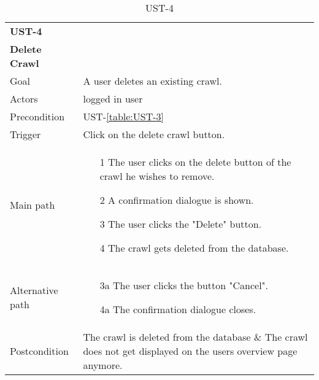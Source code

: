 \documentclass[titlepage, 12pt]{article}
\begin{document}
  \begin{table}[H]
    \begin{center}
  
      \begin{tabular}{p{4cm}|p{10cm}}
        \textbf{UST-4}\\ \textbf{Delete Crawl}                                            \\
        \hline
        Goal             & A user deletes an existing crawl.                  \\
        \hline
        Actors           & logged in user                                               \\
        \hline
        Precondition     & UST-\ref{table:UST-3}                                     \\
        \hline
        Trigger          & Click on the delete crawl button.                            \\
        \hline
        Main path        &
        \begin{itemize}
          \item [1] The user clicks on the delete button of the crawl he wishes to remove.
          \item [2] A confirmation dialogue is shown.
          \item [3] The user clicks the "Delete" button.
          \item [4] The crawl gets deleted from the database.
        \end{itemize}                                                         \\
        \hline
        Alternative path &
        \begin{itemize}
          \item [3a] The user clicks the button "Cancel".
          \item [4a] The confirmation dialogue closes.
        \end{itemize}                                                         \\
        \hline
        Postcondition    & The crawl is deleted from the database \& The crawl does not get displayed on the users overview page anymore. \\
      \end{tabular}
  
      \caption{UST-4}
      \label{table:UST-4}
  
    \end{center}
  \end{table}
\end{document}
